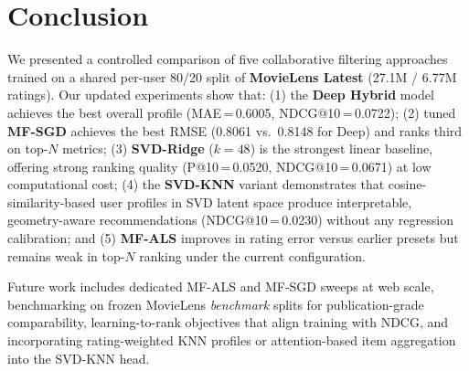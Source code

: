 \documentclass[11pt]{article}
\begin{document}
\section{Conclusion}

We presented a controlled comparison of five collaborative filtering approaches trained on a shared per-user 80/20 split of \textbf{MovieLens Latest} (27.1M / 6.77M ratings).
Our updated experiments show that:
(1) the \textbf{Deep Hybrid} model achieves the best overall profile (MAE\,=\,0.6005, NDCG@10\,=\,0.0722);
(2) tuned \textbf{MF-SGD} achieves the best RMSE (0.8061 vs.\ 0.8148 for Deep) and ranks third on top-$N$ metrics;
(3) \textbf{SVD-Ridge} ($k{=}48$) is the strongest linear baseline, offering strong ranking quality (P@10\,=\,0.0520, NDCG@10\,=\,0.0671) at low computational cost;
(4) the \textbf{SVD-KNN} variant demonstrates that cosine-similarity-based user profiles in SVD latent space produce interpretable, geometry-aware recommendations (NDCG@10\,=\,0.0230) without any regression calibration;
and (5) \textbf{MF-ALS} improves in rating error versus earlier presets but remains weak in top-$N$ ranking under the current configuration.

Future work includes dedicated MF-ALS and MF-SGD sweeps at web scale, benchmarking on frozen MovieLens \emph{benchmark} splits for publication-grade comparability, learning-to-rank objectives that align training with NDCG, and incorporating rating-weighted KNN profiles or attention-based item aggregation into the SVD-KNN head.


\end{document}
